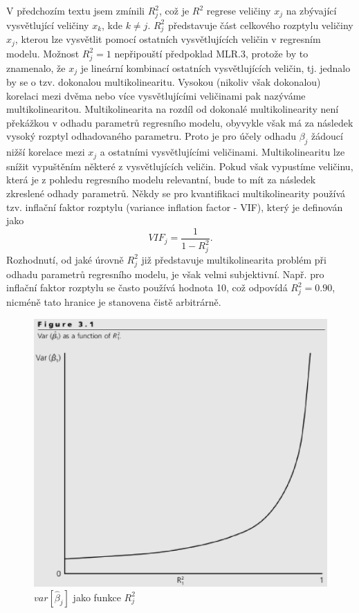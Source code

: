 V předchozím textu jsem zmínili $R^2_j$, což je $R^2$ regrese veličiny $x_j$ na zbývající vysvětlující veličiny $x_k$, kde $k \ne j$. 
$R^2_j$ představuje část celkového rozptylu veličiny $x_j$, kterou lze vysvětlit pomocí ostatních vysvětlujících veličin v 
regresním modelu. Možnost $R^2_j = 1$ nepřipouští předpoklad MLR.3, protože by to znamenalo, že $x_j$ je lineární kombinací ostatních 
vysvětlujících veličin, tj. jednalo by se o tzv. dokonalou multikolinearitu. Vysokou (nikoliv však dokonalou) korelaci mezi dvěma nebo více 
vysvětlujícími veličinami pak nazýváme multikolinearitou. Multikolinearita na rozdíl od dokonalé multikolinearity není překážkou v odhadu 
parametrů regresního modelu, obyvykle však má za následek vysoký rozptyl odhadovaného parametru. Proto je pro účely odhadu $\beta_j$ 
žádoucí nižší korelace mezi $x_j$ a ostatními vysvětlujícími veličinami. Multikolinearitu lze snížit vypuštěním některé z 
vysvětlujících veličin. Pokud však vypustíme veličinu, která je z pohledu regresního modelu relevantní, bude to mít za následek 
zkreslené odhady parametrů. Někdy se pro kvantifikaci multikolinearity používá tzv. inflační faktor rozptylu (variance inflation factor - VIF), který je definován jako
\begin{equation}
VIF_j = \frac{1}{1 - R^2_j}.
\end{equation}
Rozhodnutí, od jaké úrovně $R^2_j$ již představuje multikolinearita problém při odhadu parametrů regresního modelu, je však velmi 
subjektivní. Např. pro inflační faktor rozptylu se často používá hodnota 10, což odpovídá $R^2_j = 0.90$, nicméně tato hranice je 
stanovena čistě arbitrárně.

\begin{figure}[htp]
\centering
\includegraphics[scale = 0.5]{pictures/figure_3_1.eps}
\caption{$var[\hat{\beta}_j]$ jako funkce $R^2_j$}
\label{figure_3_1}
\end{figure} 

